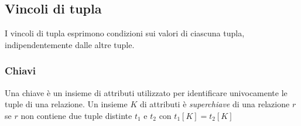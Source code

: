 \documentclass[11pt]{book}
\begin{document}
\subsection{Vincoli di tupla}
I vincoli di tupla esprimono condizioni sui valori di ciascuna tupla, indipendentemente dalle altre tuple.
\subsubsection{Chiavi}
Una chiave è un insieme di attributi utilizzato per identificare univocamente le tuple di una relazione.
Un insieme $K$ di attributi è \textit{superchiave} di una relazione $r$ se $r$ non contiene due tuple distinte $t_1$ e 
$t_2$ con $t_1[K]=t_2[K]$
\end{document}
